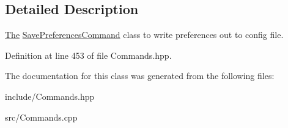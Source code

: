 \subsection{Detailed Description}
\hyperlink{namespace_the}{The} \hyperlink{class_save_preferences_command}{Save\+Preferences\+Command} class to write preferences out to config file. 

Definition at line 453 of file Commands.\+hpp.



The documentation for this class was generated from the following files\+:\begin{DoxyCompactItemize}
\item 
include/Commands.\+hpp\item 
src/Commands.\+cpp\end{DoxyCompactItemize}
